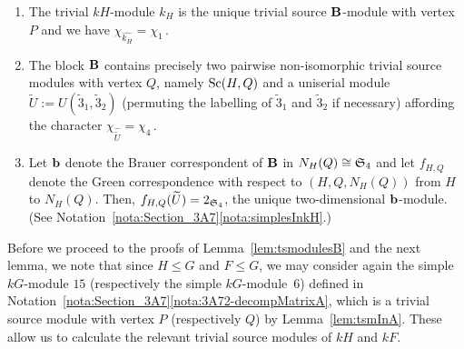 \begin{lem}\label{lem:tsmodulesB}\leavevmode
\begin{enumerate}[label={\rm(\alph*)}]
    \item The trivial $kH$-module $k_H$ is the unique trivial source ${\mathbf{B}}$-module with vertex $P$ and we have $\chi^{}_{\widehat{k_H}}=\chi^{}_1$\,.
    \item 
    The block ${\mathbf{B}}$ contains precisely two pairwise non-isomorphic trivial source modules with vertex $Q$, namely $\operatorname{Sc}(H,Q)$ and a uniserial module $\widetilde{U}:=U(\widetilde{3}_1, \widetilde{3}_2)$ (permuting the labelling of $\tilde{3}_1$ and $\tilde{3}_2$ if necessary) affording the character $\chi^{}_{\widehat{\widetilde{U}}}=\chi^{}_4$\,.
    \item Let ${\mathbf{b}}$ denote the Brauer correspondent of ${\mathbf{B}}$ in $N_H(Q)\cong {\mathfrak{S}}_4$ and let $f_{H,Q}$ denote the Green correspondence with respect to $(H,Q,N_H(Q))$ from $H$ to $N_H(Q)$.  Then, $f_{H,Q}(\widetilde{U})=2_{{\mathfrak{S}}_4}$, the unique two-dimensional ${\mathbf{b}}$-module. (See Notation~\ref{nota:Section_3A7}\ref{nota:simplesInkH}.)
\end{enumerate} 
\end{lem}


\noindent Before we proceed to the proofs of Lemma~\ref{lem:tsmodulesB} and the next lemma, 
we note that since $H\leq G$ and $F\leq G$, we may consider again the simple $kG$-module $15$ (respectively the simple $kG$-module~$6$) defined in Notation~\ref{nota:Section_3A7}\ref{nota:3A72-decompMatrixA}, which is a trivial source module with vertex $P$ (respectively $Q$) by Lemma~\ref{lem:tsmInA}.  These allow us to calculate the relevant trivial source modules of $kH$ and $kF$. 

